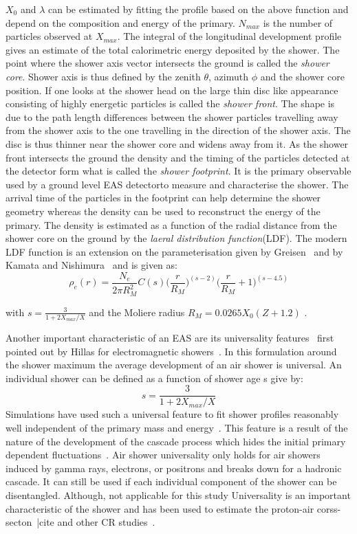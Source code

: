 $X_0$ and $\lambda$ can be estimated by fitting the profile based on the above function and depend on the composition and energy of the primary. $N_{max}$ is the number of particles observed at $X_{max}$. The integral of the longitudinal development profile gives an estimate of the total calorimetric energy deposited by the shower. 
The point where the shower axis vector intersects the ground is called the \textit{shower core}. Shower axis is thus defined by the zenith $\theta$, azimuth $\phi$ and the shower core position. If one looks at the shower head on the large thin disc like appearance consisting of highly energetic particles is called the \textit{shower front}. The shape is due to the path length differences between the shower particles travelling away from the shower axis to the one travelling in the direction of the shower axis. The disc is thus thinner near the shower core and widens away from it. As the shower front intersects the ground the density and the timing of the particles detected at the detector form what is called the \textit{shower footprint}. It is the primary observable used by a ground level EAS detectorto measure and characterise the shower. The arrival time of the particles in the footprint can help determine the shower geometry whereas the density can be used to reconstruct the energy of the primary. The density is estimated as a function of the radial distance from the shower core on the ground by the \textit{laeral distribution function}(LDF). The modern LDF function is an extension on the parameterisation given by Greisen~\cite{} and by Kamata and Nishimura~\cite{} and is given as:
\begin{equation}
    \rho_e(r) = \frac{N_e}{2 \pi R_M^2} C(s) \biggl(\frac{r}{R_M}\biggr)^{(s-2)}\biggl(\frac{r}{R_M}+1\biggr)^{(s-4.5)}
\end{equation}

with $s = \frac{3}{1+2 X_{max}/X}$ and the Moliere radius $R_M = 0.0265 X_0(Z + 1.2)$ . 


Another important characteristic of an EAS are its universality features~\cite{} first pointed out by Hillas for electromagnetic showers~\cite{}. In this formulation  around the shower maximum the average development of an air shower is universal. An individual shower can be defined as a function of shower age s give by:
\begin{equation}
    s = \frac{3}{1+2 X_{max}/X}
\end{equation}
Simulations have used such a universal feature to fit shower profiles reasonably well independent of the primary mass and energy~\cite{}. This feature is a result of the nature of the development of the cascade process which hides the initial primary dependent fluctuations~\cite{}. Air shower universality only holds for air showers induced by gamma rays, electrons, or positrons and breaks down for a hadronic cascade. It can still be used if each individual component of the shower can be disentangled. Although, not applicable for this study Universality is an important characteristic of the shower and has been used to estimate the proton-air corss-secton~|cite{} and other CR studies~\cite{}.

